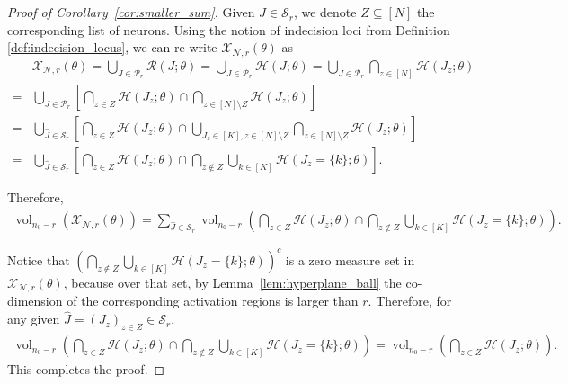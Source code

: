 \documentclass{article}
\theoremstyle{definition}
\newcommand{\net}{\mathcal{N}}
\newcommand{\nin}{n_0}
\newcommand{\vol}{\operatorname{vol}}
\begin{document}
\begin{proof}[Proof of Corollary~\ref{cor:smaller_sum}]
    Given $\hat{J}\in \mathcal{S}_r$, we denote $Z\subseteq [N]$ the corresponding list of neurons.
    Using the notion of indecision loci from Definition \ref{def:indecision_locus}, we can re-write $\mathcal{X}_{\net, r}(\theta)$ as 
        \begin{align*}
            &\mathcal{X}_{\net, r}(\theta) 
            = \bigcup_{J \in \mathcal{P}_r} \mathcal{R}(J ; \theta)
            = \bigcup_{J \in \mathcal{P}_r} \mathcal{H} (J ; \theta) 
            = \bigcup_{J \in \mathcal{P}_r} \bigcap\limits_{z\in[N]} \mathcal{H}(J_z;\theta)\\ 
            = &\bigcup_{J \in \mathcal{P}_r} \left[\bigcap\limits_{z\in Z} \mathcal{H}(J_z;\theta) \cap \bigcap\limits_{z\in [N]\setminus Z} \mathcal{H}(J_z; \theta)\right]\\
            = &\bigcup_{\hat{J}\in\mathcal{S}_r} \left[\bigcap\limits_{z\in Z} \mathcal{H}(J_z; \theta) \cap \bigcup_{J_{z}\in [K], z\in [N]\setminus Z} \bigcap\limits_{z\in[N]\setminus Z} \mathcal{H}(J_z;\theta)\right]\\
            = &\bigcup_{\hat{J}\in \mathcal{S}_r} \left[ \bigcap_{z\in Z} \mathcal{H}(J_z;\theta) \cap \bigcap_{z \notin Z} \bigcup_{k \in [K]} \mathcal{H}(J_z=\{k\}; \theta)\right].
        \end{align*}
    
    Therefore,
    \begin{align*}
        \vol_{\nin - r} \left( \mathcal{X}_{\net, r}(\theta)\right)
        = \sum_{\hat J \in \mathcal{S}_r} \vol_{\nin - r} \left( \bigcap_{z\in Z} \mathcal{H} ({J_z}; \theta) \cap \bigcap_{z \notin Z} \bigcup_{k \in [K]} \mathcal{H}(J_z=\{k\}; \theta)\right).
    \end{align*}
    
    Notice that $\left(\bigcap_{z \notin Z} \bigcup_{k \in [K]} \mathcal{H}(J_z=\{k\}; \theta)\right)^c$ is a zero measure set in $\mathcal{X}_{\mathcal{N},r}(\theta)$, because over that set, by Lemma~\ref{lem:hyperplane_ball} the co-dimension of the corresponding activation regions is larger than $r$. 
    Therefore, for any given $\hat J =(J_z)_{z\in Z}\in \mathcal{S}_r$,  
    \begin{align*}
        \vol_{\nin - r} \left( \bigcap_{z\in Z} \mathcal{H} ({J_z}; \theta) \cap \bigcap_{z \notin Z} \bigcup_{k \in [K]} \mathcal{H}(J_z=\{k\}; \theta)\right) 
        = \vol_{\nin - r} \left( \bigcap_{z\in Z} \mathcal{H} ({J_z}; \theta) \right).
    \end{align*}
    This completes the proof. 
\end{proof}
\end{document}
